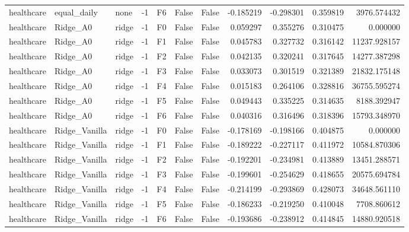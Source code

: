 \begin{tabular}{lllrlllrrrr}
healthcare &    equal\_daily &      none &    -1 &  F6 &           False &            False & -0.185219 & -0.298301 & 0.359819 &      3976.574432 \\
healthcare &       Ridge\_A0 &     ridge &    -1 &  F0 &           False &            False &  0.059297 &  0.355276 & 0.310475 &         0.000000 \\
healthcare &       Ridge\_A0 &     ridge &    -1 &  F1 &           False &            False &  0.045783 &  0.327732 & 0.316142 &     11237.928157 \\
healthcare &       Ridge\_A0 &     ridge &    -1 &  F2 &           False &            False &  0.042135 &  0.320241 & 0.317645 &     14277.387298 \\
healthcare &       Ridge\_A0 &     ridge &    -1 &  F3 &           False &            False &  0.033073 &  0.301519 & 0.321389 &     21832.175148 \\
healthcare &       Ridge\_A0 &     ridge &    -1 &  F4 &           False &            False &  0.015183 &  0.264106 & 0.328816 &     36755.595274 \\
healthcare &       Ridge\_A0 &     ridge &    -1 &  F5 &           False &            False &  0.049443 &  0.335225 & 0.314635 &      8188.392947 \\
healthcare &       Ridge\_A0 &     ridge &    -1 &  F6 &           False &            False &  0.040316 &  0.316496 & 0.318396 &     15793.348970 \\
healthcare &  Ridge\_Vanilla &     ridge &    -1 &  F0 &           False &            False & -0.178169 & -0.198166 & 0.404875 &         0.000000 \\
healthcare &  Ridge\_Vanilla &     ridge &    -1 &  F1 &           False &            False & -0.189222 & -0.227117 & 0.411972 &     10584.870306 \\
healthcare &  Ridge\_Vanilla &     ridge &    -1 &  F2 &           False &            False & -0.192201 & -0.234981 & 0.413889 &     13451.288571 \\
healthcare &  Ridge\_Vanilla &     ridge &    -1 &  F3 &           False &            False & -0.199601 & -0.254629 & 0.418655 &     20575.694784 \\
healthcare &  Ridge\_Vanilla &     ridge &    -1 &  F4 &           False &            False & -0.214199 & -0.293869 & 0.428073 &     34648.561110 \\
healthcare &  Ridge\_Vanilla &     ridge &    -1 &  F5 &           False &            False & -0.186233 & -0.219250 & 0.410048 &      7708.860612 \\
healthcare &  Ridge\_Vanilla &     ridge &    -1 &  F6 &           False &            False & -0.193686 & -0.238912 & 0.414845 &     14880.920518 \\
\bottomrule
\end{tabular}
